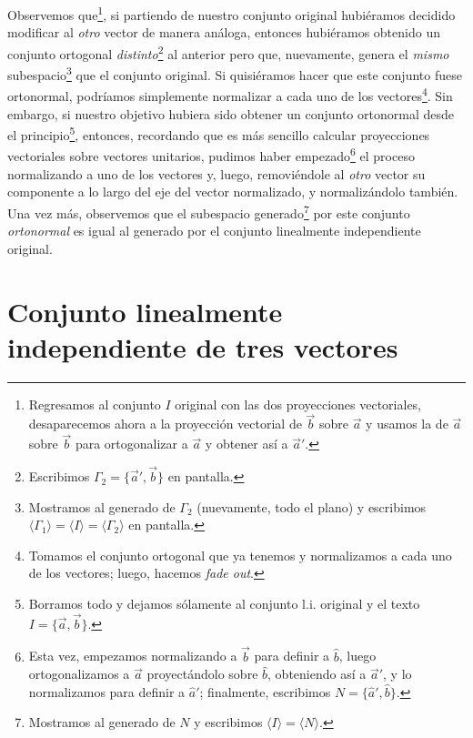 \documentclass[12pt,dvipsnames]{article}
\numberwithin{equation}{section}
\begin{document}
Observemos que\footnote{Regresamos al conjunto $I$ original con las dos proyecciones vectoriales, desaparecemos ahora a la proyección vectorial de $\vec{b}$ sobre $\vec{a}$ y usamos la de $\vec{a}$ sobre $\vec{b}$ para ortogonalizar a $\vec{a}$ y obtener así a $\vec{a}'$.}, si partiendo de nuestro conjunto original hubiéramos decidido modificar al \emph{otro} vector de manera análoga, entonces hubiéramos obtenido un conjunto ortogonal \emph{distinto}\footnote{Escribimos $\Gamma_2=\{\vec{a}',\vec{b}\}$ en pantalla.} al anterior pero que, nuevamente, genera el \emph{mismo} subespacio\footnote{Mostramos al generado de $\Gamma_2$ (nuevamente, todo el plano) y escribimos $\langle \Gamma_1 \rangle = \langle I \rangle=\langle \Gamma_2 \rangle$ en pantalla.} que el conjunto original. Si quisiéramos hacer que este conjunto fuese ortonormal, podríamos simplemente normalizar a cada uno de los vectores\footnote{Tomamos el conjunto ortogonal que ya tenemos y normalizamos a cada uno de los vectores; luego, hacemos \emph{fade out}.}. Sin embargo, si nuestro objetivo hubiera sido obtener un conjunto ortonormal desde el principio\footnote{Borramos todo y dejamos sólamente al conjunto l.i. original y el texto $I=\{\vec{a},\vec{b}\}$.}, entonces, recordando que es más sencillo calcular proyecciones vectoriales sobre vectores unitarios, pudimos haber empezado\footnote{Esta vez, empezamos normalizando a $\vec{b}$ para definir a $\hat{b}$, luego ortogonalizamos a $\vec{a}$ proyectándolo sobre $\hat{b}$, obteniendo así a $\vec{a}'$, y lo normalizamos para definir a $\hat{a}'$; finalmente, escribimos $N=\{\hat{a}',\hat{b}\}$.} el proceso normalizando a uno de los vectores y, luego, removiéndole al \emph{otro} vector su componente a lo largo del eje del vector normalizado, y normalizándolo también. Una vez más, observemos que el subespacio generado\footnote{Mostramos al generado de $N$ y escribimos $\langle I\rangle=\langle N\rangle$.} por este conjunto \emph{ortonormal} es igual al generado por el conjunto linealmente independiente original.


\section{Conjunto linealmente independiente de tres vectores}
\end{document}
